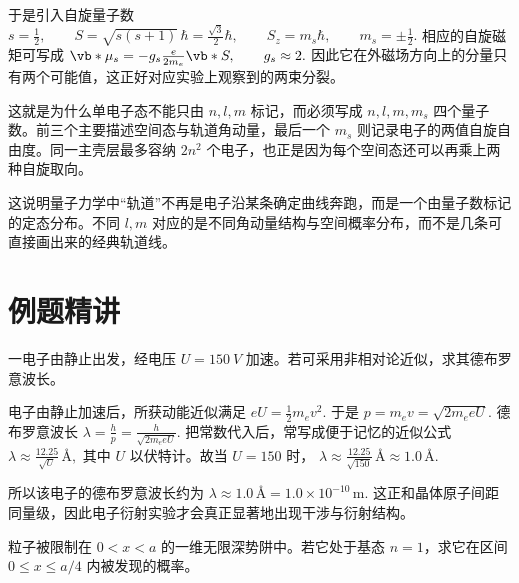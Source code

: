 \documentclass[lang=cn,11pt]{elegantbook}
\begin{document}
于是引入自旋量子数
 \(s=\frac12, \qquad S=\sqrt{s(s+1)}\,\hbar=\frac{\sqrt3}{2}\hbar, \qquad S_z=m_s\hbar, \qquad m_s=\pm \frac12.\) 
相应的自旋磁矩可写成
 \(\vb*{\mu}_s=-g_s\frac{e}{2m_e}\vb*{S}, \qquad g_s\approx 2.\) 
因此它在外磁场方向上的分量只有两个可能值，这正好对应实验上观察到的两束分裂。

\begin{note}
这就是为什么单电子态不能只由 \(n,l,m\) 标记，而必须写成 \(n,l,m,m_s\) 四个量子数。前三个主要描述空间态与轨道角动量，最后一个 \(m_s\) 则记录电子的两值自旋自由度。同一主壳层最多容纳 \(2n^2\) 个电子，也正是因为每个空间态还可以再乘上两种自旋取向。
\end{note}

\begin{remark}
这说明量子力学中“轨道”不再是电子沿某条确定曲线奔跑，而是一个由量子数标记的定态分布。不同 \(l,m\) 对应的是不同角动量结构与空间概率分布，而不是几条可直接画出来的经典轨道线。
\end{remark}

\section{例题精讲}

\begin{exercise}[电子经电压加速后的德布罗意波长]
一电子由静止出发，经电压 \(U=\SI{150}{V}\) 加速。若可采用非相对论近似，求其德布罗意波长。
\end{exercise}

\begin{solution}
电子由静止加速后，所获动能近似满足
 \(eU=\frac12 m_ev^2.\) 
于是
 \(p=m_ev=\sqrt{2m_eeU}.\) 
德布罗意波长
 \(\lambda=\frac{h}{p} =\frac{h}{\sqrt{2m_eeU}}.\) 
把常数代入后，常写成便于记忆的近似公式
 \(\lambda\approx \frac{12.25}{\sqrt{U}}\,\text{\AA},\) 
其中 \(U\) 以伏特计。故当 \(U=150\) 时，
 \(\lambda\approx \frac{12.25}{\sqrt{150}}\,\text{\AA}\approx 1.0\,\text{\AA}.\) 

所以该电子的德布罗意波长约为
 \(\boxed{\lambda\approx 1.0\,\text{\AA}=1.0\times 10^{-10}\,\mathrm{m}.}\) 
这正和晶体原子间距同量级，因此电子衍射实验才会真正显著地出现干涉与衍射结构。
\end{solution}

\begin{exercise}
粒子被限制在 \(0<x<a\) 的一维无限深势阱中。若它处于基态 \(n=1\)，求它在区间 \(0\le x\le a/4\) 内被发现的概率。
\end{exercise}
\end{document}
